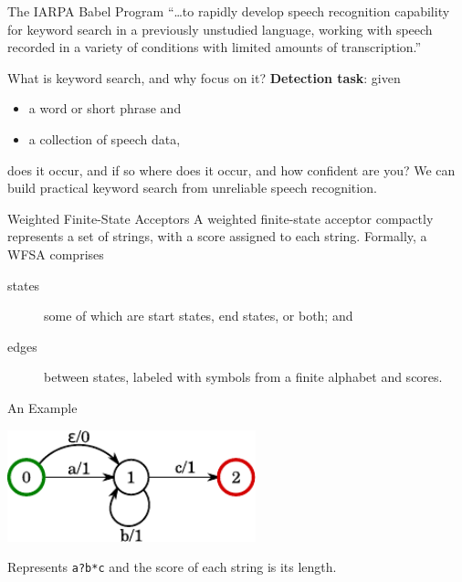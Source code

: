 \begin{frame}{The IARPA Babel Program}{}
  \Large{``\ldots to rapidly develop speech recognition
    capability for \alert{keyword search} in a previously unstudied
    language, working with speech recorded in a variety of
    conditions with limited amounts of transcription.''}\par
\end{frame}

\begin{frame}{What is keyword search, and why focus on it?}{}
  {\bf Detection task}: given
    \begin{itemize}
    \item a word or short phrase and
    \item a collection of speech data,
    \end{itemize}
    does it occur, and if so where does it occur, and how confident are you?
    \vfill
    We can build practical keyword search from
    \alert{unreliable} speech recognition.
\end{frame}

\begin{frame}{Weighted Finite-State Acceptors}{}
  A \alert{weighted finite-state acceptor} compactly represents a set
  of strings, with a score assigned to each string.
  \vfill
  Formally, a WFSA comprises
  \begin{description}
  \item[states] some of which are start states, end states, or both;
    and
  \item[edges] between states, labeled with symbols from a finite
    alphabet and scores.
  \end{description}
\end{frame}

\begin{frame}{An Example}{}
  \begin{center}
    \includegraphics[width=72mm]{figures/WFSA}
  \end{center}
  \vfill
  Represents {\tt a?b*c} and the score of each string is its length.
\end{frame}

